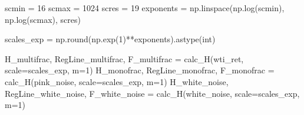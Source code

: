 \documentclass[
  letterpaper,
]{report}
\newenvironment{Shaded}{\begin{snugshade}}{\end{snugshade}}
\newcommand{\BuiltInTok}[1]{\textcolor[rgb]{0.00,0.23,0.31}{#1}}
\newcommand{\DecValTok}[1]{\textcolor[rgb]{0.68,0.00,0.00}{#1}}
\newcommand{\NormalTok}[1]{\textcolor[rgb]{0.00,0.23,0.31}{#1}}
\newcommand{\OperatorTok}[1]{\textcolor[rgb]{0.37,0.37,0.37}{#1}}
\begin{document}
\begin{Shaded}
\begin{Highlighting}[]
\NormalTok{scmin }\OperatorTok{=} \DecValTok{16}
\NormalTok{scmax }\OperatorTok{=} \DecValTok{1024}
\NormalTok{scres }\OperatorTok{=} \DecValTok{19}
\NormalTok{exponents }\OperatorTok{=}\NormalTok{ np.linspace(np.log(scmin), np.log(scmax), scres)}

\NormalTok{scales\_exp }\OperatorTok{=}\NormalTok{ np.}\BuiltInTok{round}\NormalTok{(np.exp(}\DecValTok{1}\NormalTok{)}\OperatorTok{**}\NormalTok{exponents).astype(}\BuiltInTok{int}\NormalTok{)}

\NormalTok{H\_multifrac, RegLine\_multifrac, F\_multifrac }\OperatorTok{=}\NormalTok{ calc\_H(wti\_ret, scale}\OperatorTok{=}\NormalTok{scales\_exp, m}\OperatorTok{=}\DecValTok{1}\NormalTok{)}
\NormalTok{H\_monofrac, RegLine\_monofrac, F\_monofrac }\OperatorTok{=}\NormalTok{ calc\_H(pink\_noise, scale}\OperatorTok{=}\NormalTok{scales\_exp, m}\OperatorTok{=}\DecValTok{1}\NormalTok{)}
\NormalTok{H\_white\_noise, RegLine\_white\_noise, F\_white\_noise }\OperatorTok{=}\NormalTok{ calc\_H(white\_noise, scale}\OperatorTok{=}\NormalTok{scales\_exp, m}\OperatorTok{=}\DecValTok{1}\NormalTok{)}
\end{Highlighting}
\end{Shaded}
\end{document}
